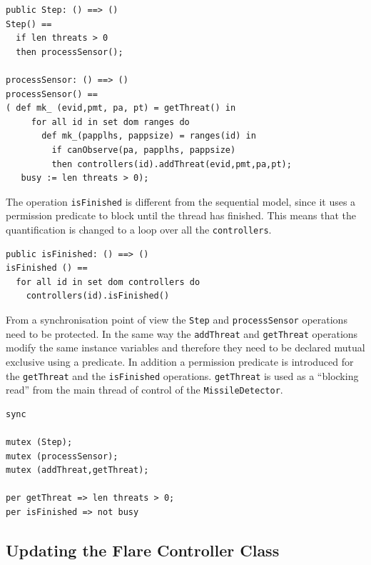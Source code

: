 \documentclass{overturerepchap}
\begin{document}
\begin{lstlisting} 
public Step: () ==> ()
Step() ==
  if len threats > 0
  then processSensor();

processSensor: () ==> ()
processSensor() ==
( def mk_ (evid,pmt, pa, pt) = getThreat() in
     for all id in set dom ranges do
       def mk_(papplhs, pappsize) = ranges(id) in
         if canObserve(pa, papplhs, pappsize)
         then controllers(id).addThreat(evid,pmt,pa,pt);
   busy := len threats > 0);
\end{lstlisting}

The operation \texttt{isFinished} is different from the sequential
model, since it uses a permission predicate to block until the thread
has finished. This means that the {\bf{}} quantification is
changed to a loop over all the \texttt{controllers}.

\begin{lstlisting}
public isFinished: () ==> ()
isFinished () ==
  for all id in set dom controllers do
    controllers(id).isFinished()
\end{lstlisting}

From a synchronisation point of view the \texttt{Step} and \texttt{processSensor} operations need to be protected. In the same way the \texttt{addThreat} and 
\texttt{getThreat} operations modify the same instance variables and
therefore they need to be declared mutual exclusive using a
{\bf{}} 
predicate. In addition a permission predicate is introduced for the
\texttt{getThreat} and the \texttt{isFinished} operations. 
\texttt{getThreat} is used as a ``blocking read'' from the main
thread of control of the \texttt{MissileDetector}.

\begin{lstlisting}
sync

mutex (Step);
mutex (processSensor);
mutex (addThreat,getThreat);

per getThreat => len threats > 0;
per isFinished => not busy
\end{lstlisting}

\subsection{Updating the Flare Controller Class}

%
\end{document}
